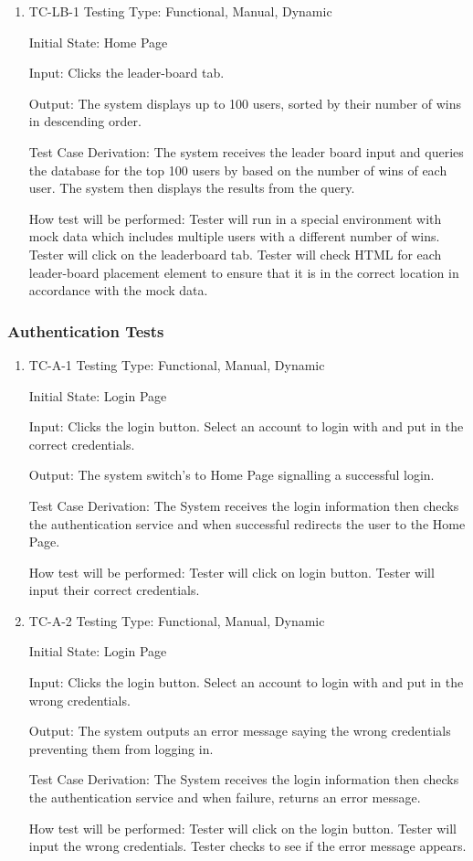 \documentclass[12pt, titlepage]{article}
\begin{document}
\begin{enumerate}
    \item {TC-LB-1}
    Testing Type: Functional, Manual, Dynamic
					
Initial State: Home Page
					
Input: Clicks the leader-board tab.
					
Output: The system displays up to 100 users, sorted by their number of wins in descending order.

Test Case Derivation: The system receives the leader board input and queries the database for the top 100 users by based on the number of wins of each user. The system then displays the results from the query.
					
How test will be performed: Tester will run in a special environment with mock data which includes multiple users with a different number of wins. Tester will click on the leaderboard tab. Tester will check HTML for each leader-board placement element to ensure that it is in the correct location in accordance with the mock data.
\end{enumerate}

\subsubsection{Authentication Tests}


\begin{enumerate}
    \item {TC-A-1}
    Testing Type: Functional, Manual, Dynamic
					
Initial State: Login Page
					
Input: Clicks the login button. Select an account to login with and put in the correct credentials.
					
Output: The system switch's to Home Page signalling a successful login.

Test Case Derivation: The System receives the login information then checks the authentication service and when successful redirects the user to the Home Page.
					
How test will be performed: Tester will click on login button. Tester will input their correct credentials.

 \item {TC-A-2}
    Testing Type: Functional, Manual, Dynamic
					
Initial State: Login Page
					
Input: Clicks the login button. Select an account to login with and put in the wrong credentials.
					
Output: The system outputs an error message saying the wrong credentials preventing them from logging in.

Test Case Derivation: The System receives the login information then checks the authentication service and when failure, returns an error message.
					
How test will be performed: Tester will click on the login button. Tester will input the wrong credentials. Tester checks to see if the error message appears.
\end{enumerate}
\end{document}
